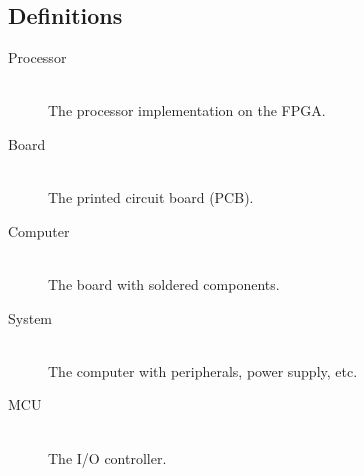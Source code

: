 \subsection*{Definitions}

\begin{description}
    \item[Processor]
    \hfill\\
    The processor implementation on the FPGA.
    \item[Board]
    \hfill\\
    The printed circuit board (PCB).
    \item[Computer]
    \hfill\\
    The board with soldered components.
    \item[System]
    \hfill\\
    The computer with peripherals, power supply, etc.
    \item[MCU]
    \hfill\\
    The I/O controller.
\end{description}

